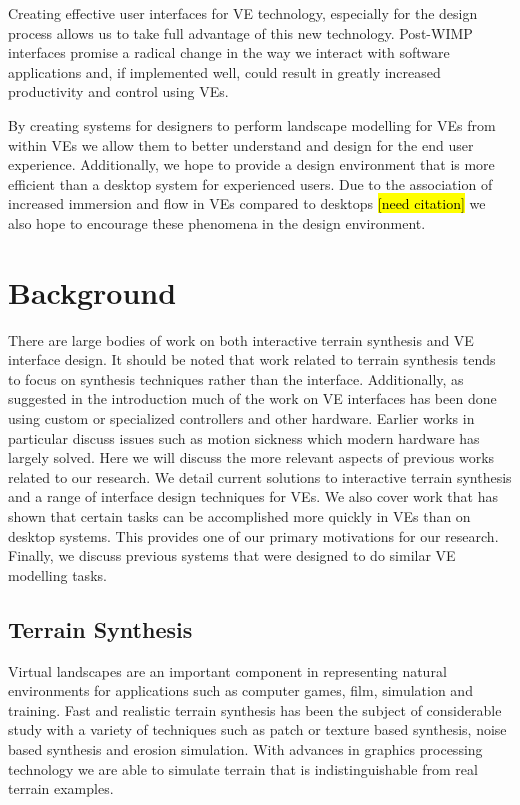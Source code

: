 \documentclass{sig-alternate-05-2015}
\begin{document}
Creating effective user interfaces for VE technology, especially for the design process allows us to take full advantage of this new technology. Post-WIMP interfaces promise a radical change in the way we interact with software applications and, if implemented well, could result in greatly increased productivity and control using VEs.
 
 By creating systems for designers to perform landscape modelling for VEs from within VEs we allow them to better understand and design for the end user experience. Additionally, we hope to provide a design environment that is more efficient than a desktop system for experienced users. Due to the association of increased immersion and flow in VEs compared to desktops \hl{[need citation]} we also hope to encourage these phenomena in the design environment.
\section{Background}
There are large bodies of work on both interactive terrain synthesis and VE interface design. It should be noted that work related to terrain synthesis tends to focus on synthesis techniques rather than the interface. Additionally, as suggested in the introduction much of the work on VE interfaces has been done using custom or specialized controllers and other hardware. Earlier works in particular discuss issues such as motion sickness which modern hardware has largely solved. Here we will discuss the more relevant aspects of previous works related to our research. We detail current solutions to interactive terrain synthesis and a range of interface design techniques for VEs. We also cover work that has shown that certain tasks can be accomplished more quickly in VEs than on desktop systems. This provides one of our primary motivations for our research. Finally, we discuss previous systems that were designed to do similar VE modelling tasks. 
\subsection{Terrain Synthesis} 
Virtual landscapes are an important component in representing natural environments for applications such as computer games, film, simulation and training\cite{Gain2015}. Fast and realistic terrain synthesis has been the subject of considerable study with a variety of techniques such as patch or texture based synthesis\cite{Cruz2015, Tasse2012}, noise based synthesis\cite{Musgrave1989} and erosion simulation\cite{Anh2007}. With advances in graphics processing technology we are able to simulate terrain that is indistinguishable from real terrain examples\cite{Gain2015}. 
\end{document}
